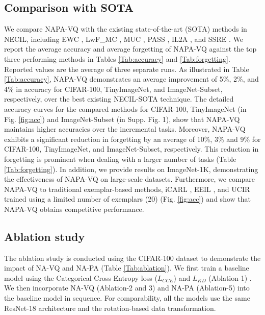 \documentclass[10pt,twocolumn,letterpaper]{article}
\begin{document}
\subsection{Comparison with SOTA}


We compare NAPA-VQ with the existing state-of-the-art (SOTA) methods in NECIL, including EWC \cite{Kirkpatrick2017OvercomingNetworks}, LwF\_MC \cite{Lampert2017}, MUC \cite{Liu2020MoreLearning},
PASS \cite{Zhu2021PrototypeLearning}, IL2A \cite{Zhu2021Class-IncrementalAugmentation}, and SSRE \cite{Zhu2022Self-SustainingLearning}. We report the average accuracy and average forgetting of NAPA-VQ against the top three performing methods in Tables \ref{Tab:accuracy} and \ref{Tab:forgetting}. Reported values are the average of three separate runs. As illustrated in Table \ref{Tab:accuracy}, NAPA-VQ demonstrates an average improvement of 5\%, 2\%, and 4\% in accuracy for CIFAR-100, TinyImageNet, and ImageNet-Subset, respectively, over the best existing NECIL-SOTA technique. The detailed accuracy curves for the compared methods for CIFAR-100, TinyImageNet (in Fig. \ref{fig:acc}) and ImageNet-Subset (in Supp. Fig. 1), show that NAPA-VQ maintains higher accuracies over the incremental tasks. Moreover, NAPA-VQ exhibits a significant reduction in forgetting by an average of 10\%, 3\% and 9\% for CIFAR-100, TinyImageNet, and ImageNet-Subset, respectively. This reduction in forgetting is prominent when dealing with a larger number of tasks (Table \ref{Tab:forgetting}). 
In addition, we provide results on ImageNet-1K, demonstrating the effectiveness of NAPA-VQ on large-scale datasets. Furthermore, we compare NAPA-VQ to traditional exemplar-based methods, iCARL \cite{Lampert2017}, EEIL \cite{Castro2018End-to-endLearning}, and UCIR \cite{Hou2019LearningRebalancing} trained using a limited number of exemplars (20) (Fig. \ref{fig:acc}) and show that NAPA-VQ obtains competitive performance.  

\subsection{Ablation study}
     The ablation study is conducted using the CIFAR-100 dataset to demonstrate the impact of NA-VQ and NA-PA (Table \ref{Tab:ablation}). 
We first train a baseline model using the Categorical Cross Entropy loss ($L_{CCE}$) and $L_{KD}$ (Ablation-1) \cite{Zhu2022Self-SustainingLearning}. We then incorporate NA-VQ (Ablation-2 and 3) and NA-PA (Ablation-5) into the baseline model in sequence. For comparability, all the models use the same ResNet-18 architecture and the rotation-based data transformation.
\end{document}
